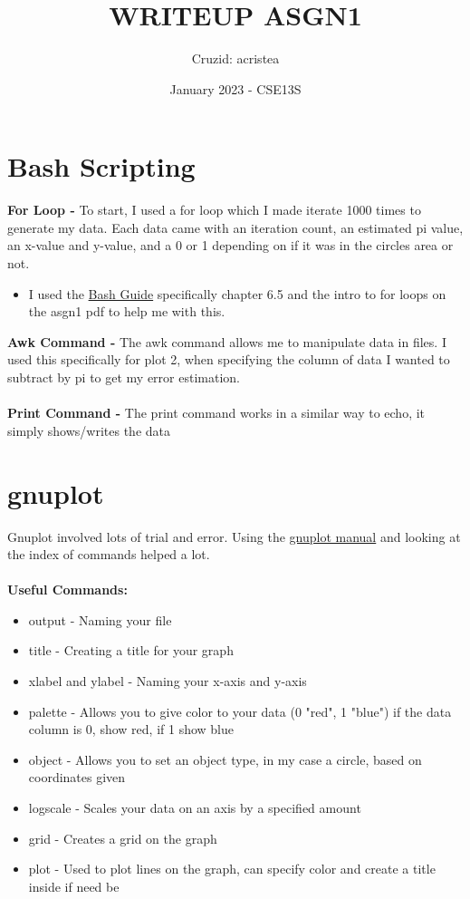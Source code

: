 \documentclass{article}
\title{WRITEUP ASGN1}
\author{Cruzid: acristea}
\date{January 2023 - CSE13S}
\begin{document}
\maketitle

\section{Bash Scripting} 
\textbf{For Loop -} 
To start, I used a for loop which I made iterate 1000 times to generate my data. Each data came with an iteration count, an estimated pi value, an x-value and y-value, and a 0 or 1 depending on if it was in the circles area or not. 
\begin{itemize}
    \item I used the \href{https://folk.ntnu.no/geirha/bashguide.pdf}{Bash Guide} specifically chapter 6.5 and the intro to for loops on the asgn1 pdf to help me with this. 
\end{itemize}
\textbf{Awk Command -} The awk command allows me to manipulate data in files. I used this specifically for plot 2, when specifying the column of data I wanted to subtract by pi to get my error estimation. \\
\\
\textbf{Print Command -} The print command works in a similar way to echo, it simply shows/writes the data
\section{gnuplot}


Gnuplot involved lots of trial and error. Using the \href{http://gnuplot.info/docs_5.5/Commands.html}{gnuplot manual} and looking at the index of commands helped a lot.\\
\\
\textbf{Useful Commands:}
\begin{itemize}
    \item output - Naming your file
    \item title - Creating a title for your graph
    \item xlabel and ylabel - Naming your x-axis and y-axis
    \item palette - Allows you to give color to your data (0 "red", 1 "blue") if the data column is 0, show red, if 1 show blue
    \item object - Allows you to set an object type, in my case a circle, based on coordinates given
    \item logscale - Scales your data on an axis by a specified amount
    \item grid - Creates a grid on the graph
    \item plot - Used to plot lines on the graph, can specify color and create a title inside if need be
\end{itemize}
\end{document}
